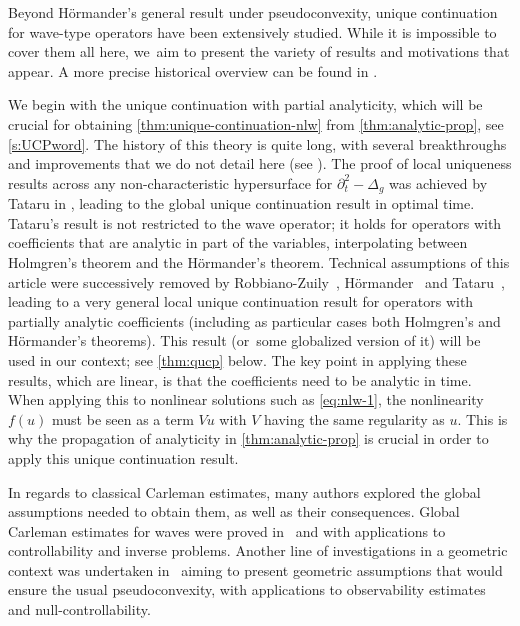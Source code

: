 \documentclass[JEP,XML,SOM,Unicode,published]{cedram}
\theoremstyle{definition}
\begin{document}
Beyond Hörmander's general result \cite{H:63} under pseudoconvexity, unique continuation for wave-type operators have been extensively studied. While it is impossible to cover them all here, we~aim to present the variety of results and motivations that appear. A more precise historical overview can be found in \cite[\S 4]{LL:23Lecture}.

We begin with the unique continuation with partial analyticity, which will be crucial for obtaining \cref{thm:unique-continuation-nlw} from \cref{thm:analytic-prop}, see \cref{s:UCPword}. The history of this theory is quite long, with several breakthroughs and improvements that we do not detail here (see \cite[\S 4]{LL:23Lecture}). The proof of local uniqueness results across any non-characteristic hypersurface for $\partial_t^2 - \Delta_g$ was achieved by Tataru in \cite{Tat95}, leading to the global unique continuation result in optimal time. Tataru's result is not restricted to the wave operator;
it holds for operators with coefficients that are analytic in part of the variables, interpolating between Holmgren's theorem and the Hörmander's theorem. Technical assumptions of this article were successively removed by Robbiano-Zuily~\cite{RZ:98}, Hörmander~\cite{Hor:97} and Tataru~\cite{Tat99}, leading to a very general local unique continuation result for operators with partially analytic coefficients (including as particular cases both Holmgren's and Hörmander's theorems). This result (or~some globalized version of it) will be used in our context; see \cref{thm:qucp} below. The key point in applying these results, which are linear, is that the coefficients need to be analytic in time. When applying this to nonlinear solutions such as \eqref{eq:nlw-1}, the nonlinearity $f(u)$ must be seen as a term $Vu$ with $V$ having the same regularity as $u$. This is why the propagation of analyticity in \cref{thm:analytic-prop} is crucial in order to apply this unique continuation result.

In regards to classical Carleman estimates, many authors explored the global assumptions needed to obtain them, as well as their consequences. Global Carleman estimates for waves were proved in~\cite[Ch.\,4]{FI:96} and \cite{BDBE:13} with applications to controllability and inverse problems. Another line of investigations in a geometric context was undertaken in~\cite{DZZ:08,Shao:19,JS:24} aiming to present geometric assumptions that would ensure the usual pseudoconvexity, with applications to observability estimates and null-controllability.
\end{document}
